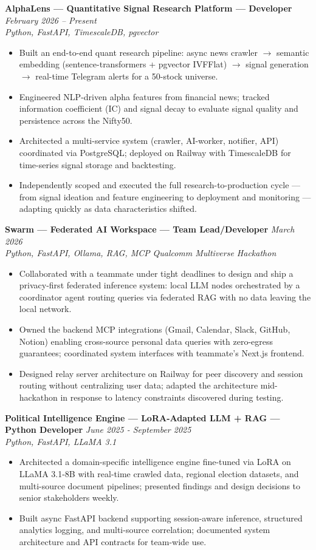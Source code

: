 \documentclass[10.5pt]{article}
\newcommand{\blist}{\begin{itemize}[leftmargin=*,noitemsep,topsep=1pt,parsep=0pt,itemsep=1pt]}
\newcommand{\elist}{\end{itemize}\vspace{3pt}}
\begin{document}
\textbf{AlphaLens --- Quantitative Signal Research Platform --- Developer} \hfill \textit{February 2026 -- Present} \\ \textit{Python, FastAPI, TimescaleDB, pgvector}
\blist
    \item Built an end-to-end quant research pipeline: async news crawler $\rightarrow$ semantic embedding (sentence-transformers + pgvector IVFFlat) $\rightarrow$ signal generation $\rightarrow$ real-time Telegram alerts for a 50-stock universe.
    \item Engineered NLP-driven alpha features from financial news; tracked information coefficient (IC) and signal decay to evaluate signal quality and persistence across the Nifty50.
    \item Architected a multi-service system (crawler, AI-worker, notifier, API) coordinated via PostgreSQL; deployed on Railway with TimescaleDB for time-series signal storage and backtesting.
    \item Independently scoped and executed the full research-to-production cycle --- from signal ideation and feature engineering to deployment and monitoring --- adapting quickly as data characteristics shifted.
\elist

\textbf{Swarm --- Federated AI Workspace  --- Team Lead/Developer} \hfill \textit{March 2026} \\ \hfill \textit{Python, FastAPI, Ollama, RAG, MCP} \hfill \textit{\small Qualcomm Multiverse Hackathon}
\blist
    \item Collaborated with a teammate under tight deadlines to design and ship a privacy-first federated inference system: local LLM nodes orchestrated by a coordinator agent routing queries via federated RAG with no data leaving the local network.
    \item Owned the backend MCP integrations (Gmail, Calendar, Slack, GitHub, Notion) enabling cross-source personal data queries with zero-egress guarantees; coordinated system interfaces with teammate's Next.js frontend.
    \item Designed relay server architecture on Railway for peer discovery and session routing without centralizing user data; adapted the architecture mid-hackathon in response to latency constraints discovered during testing.
\elist

\textbf{Political Intelligence Engine --- LoRA-Adapted LLM + RAG --- Python Developer} \hfill \textit{June 2025 - September 2025} \\ \hfill \textit{Python, FastAPI, LLaMA 3.1}
\blist
    \item Architected a domain-specific intelligence engine fine-tuned via LoRA on LLaMA 3.1-8B with real-time crawled data, regional election datasets, and multi-source document pipelines; presented findings and design decisions to senior stakeholders weekly.
    \item Built async FastAPI backend supporting session-aware inference, structured analytics logging, and multi-source correlation; documented system architecture and API contracts for team-wide use.
\elist
\end{document}
